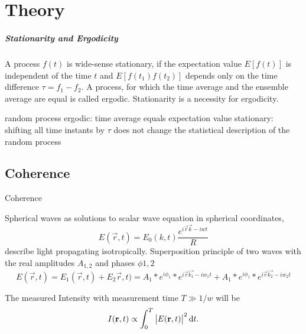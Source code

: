 \chapter{Theory}





\paragraph{Stationarity and Ergodicity}
A process $f(t)$ is wide-sense stationary, if the expectation value $E[f(t)]$ is independent of the time $t$ and $E[f(t_1)f(t_2)]$ depends only on the time difference $\tau=f_1-f_2$. A process, for which the time average and the ensemble average are equal is called ergodic. Stationarity is a necessity for ergodicity.

random process
ergodic: time average equals expectation value
stationary: shifting all time instants by $\tau$ does not change the statistical description of the random process 



\section{Coherence}


Coherence


Spherical waves as  solutions to scalar wave equation in spherical coordinates,
\begin{equation}
	E(\vec{r},t)=E_0(k,t) \frac{e^{i\vec{r}\vec{k}-iwt}}{R}
	\end{equation}
describe light propagating isotropically. 
Superposition principle of two waves with the real amplitudes $A_{1,2}$ and phases $\phi{1,2}$
\begin{equation}
E(\vec{r},t)=E_1(\vec{r},t)+E_2\vec{r},t)=A_1*e^{i\phi_1} * e^{i\vec{r}\vec{k_1}-iw_1t} + A_1*e^{i\phi_1} * e^{i\vec{r}\vec{k_2}-iw_2t} 
\end{equation} 

The measured Intensity with measurement time $T\gg1/w$ will be
\begin{equation}
	I(\mathbf{r},t)\propto \int_0^T \left|E(\mathbf{r},t)\right|^2 \operatorname{\mathrm{d}\!} t .
\end{equation}

